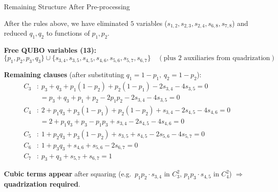 \documentclass[9pt]{beamer}
\begin{document}
\begin{frame}{Remaining Structure After Pre-processing}
\small

After the rules above, we have eliminated $5$ variables ($s_{1,2}, s_{2,3}, s_{2,4}, s_{6,8}, s_{7,8}$) and reduced $q_1, q_2$ to functions of $p_1, p_2$.

\medskip
\textbf{Free QUBO variables (13):}
\[
\{p_1, p_2, p_3, q_3\} \cup \{s_{3,4}, s_{3,5}, s_{4,5}, s_{4,6}, s_{5,6}, s_{5,7}, s_{6,7}\}
\quad (\text{plus } 2 \text{ auxiliaries from quadrization})
\]

\textbf{Remaining clauses} (after substituting $q_1{=}1{-}p_1,\ q_2{=}1{-}p_2$):
\begin{align*}
C_3 &:\ p_3 + q_3 + p_1(1{-}p_2) + p_2(1{-}p_1) - 2 s_{3,4} - 4 s_{3,5} = 0 \\
    &\ \ = p_3 + q_3 + p_1 + p_2 - 2 p_1 p_2 - 2 s_{3,4} - 4 s_{3,5} = 0 \\
C_4 &:\ 2 + p_1 q_3 + p_3(1{-}p_1) + p_2(1{-}p_2) + s_{3,4} - 2 s_{4,5} - 4 s_{4,6} = 0 \\
    &\ \ = 2 + p_1 q_3 + p_3 - p_1 p_3 + s_{3,4} - 2 s_{4,5} - 4 s_{4,6} = 0 \\
C_5 &:\ 1 + p_2 q_3 + p_3(1{-}p_2) + s_{3,5} + s_{4,5} - 2 s_{5,6} - 4 s_{5,7} = 0 \\
C_6 &:\ 1 + p_3 q_3 + s_{4,6} + s_{5,6} - 2 s_{6,7} = 0 \\
C_7 &:\ p_3 + q_3 + s_{5,7} + s_{6,7} = 1
\end{align*}

\textbf{Cubic terms appear} after squaring (e.g.\ $p_1 p_2 \cdot s_{3,4}$ in $C_3^2$, $p_1 p_3 \cdot s_{4,5}$ in $C_4^2$) $\Rightarrow$ \textbf{quadrization required}.
\end{frame}
\end{document}

